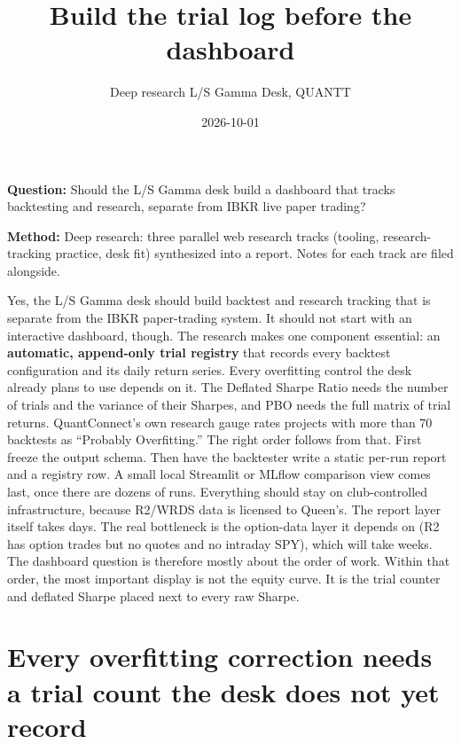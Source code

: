 \documentclass{article}
\title{Build the trial log before the dashboard}
\author{Deep research \textperiodcentered{} L/S Gamma Desk, QUANTT}
\date{2026-10-01}
\begin{document}
\maketitle

\textbf{Question:} Should the L/\allowbreak{}S Gamma desk build a dashboard that tracks backtesting and research, separate from IBKR live paper trading?

\textbf{Method:} Deep research: three parallel web research tracks (tooling, research-tracking practice, desk fit) synthesized into a report. Notes for each track are filed alongside.

Yes, the L/\allowbreak{}S Gamma desk should build backtest and research tracking that is separate from the IBKR paper-trading system. It should not start with an interactive dashboard, though. The research makes one component essential: an \textbf{automatic, append-only trial registry} that records every backtest configuration and its daily return series. Every overfitting control the desk already plans to use depends on it. The Deflated Sharpe Ratio needs the number of trials and the variance of their Sharpes, and PBO needs the full matrix of trial returns. QuantConnect's own research gauge rates projects with more than 70 backtests as ``Probably Overfitting.'' The right order follows from that. First freeze the output schema. Then have the backtester write a static per-run report and a registry row. A small local Streamlit or MLflow comparison view comes last, once there are dozens of runs. Everything should stay on club-controlled infrastructure, because R2/\allowbreak{}WRDS data is licensed to Queen's. The report layer itself takes days. The real bottleneck is the option-data layer it depends on (R2 has option trades but no quotes and no intraday SPY), which will take weeks. The dashboard question is therefore mostly about the order of work. Within that order, the most important display is not the equity curve. It is the trial counter and deflated Sharpe placed next to every raw Sharpe.

\section{Every overfitting correction needs a trial count the desk does not yet record}
\end{document}

